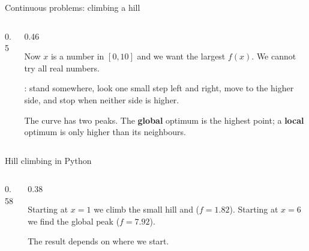 \documentclass[aspectratio=169,10pt]{beamer}
\begin{document}
\begin{frame}{Continuous problems: climbing a hill}
\begin{columns}[T]
\begin{column}{0.5\textwidth}
\begin{sfig}[0.85]
\end{sfig}
\end{column}
\begin{column}{0.46\textwidth}
{\small
Now $x$ is a number in $[0,10]$ and we want the largest $f(x)$. We cannot try all real numbers.

\vspace{2mm}
: stand somewhere, look one small step left and right, move to the higher side, and stop when neither side is higher.

\vspace{2mm}
The curve has two peaks. The \textbf{global} optimum is the highest point; a \textbf{local} optimum is only higher than its neighbours.}
\end{column}
\end{columns}
\end{frame}

\begin{frame}{Hill climbing in Python}
\begin{columns}[T]
\begin{column}{0.58\textwidth}
\end{column}
\begin{column}{0.38\textwidth}
{\small
\vspace{2mm}
Starting at $x=1$ we climb the small hill and  ($f=1.82$). Starting at $x=6$ we find the global peak ($f=7.92$).

\vspace{2mm}
The result depends on where we start.}
\end{column}
\end{columns}
\end{frame}
\end{document}
